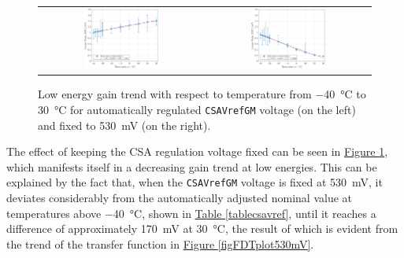 \begin{figure}[h!]
    \centering
    \begin{tabular}{cc}
        \includegraphics[width=0.475\textwidth]{Images/chap1/results/gain_pedestal/low_energy_gain_auto_0011.pdf} & \includegraphics[width=0.475\textwidth]{Images/chap1/results/gain_pedestal/low_energy_gain_530mV.pdf}\\
    \end{tabular}
    \caption{Low energy gain trend with respect to temperature from \SI{-40}{\celsius} to \SI{30}{\celsius} for automatically regulated \texttt{CSAVrefGM} voltage (on the left) and fixed to \SI{530}{\milli\volt} (on the right).}
    \label{figFDTgainLowEnergies}
\end{figure}

The effect of keeping the CSA regulation voltage fixed can be seen in \hyperref[figFDTgainLowEnergies]{Figure \ref{figFDTgainLowEnergies}}, which manifests itself in a decreasing gain trend at low energies. This can be explained by the fact that, when the \texttt{CSAVrefGM} voltage is fixed at \SI{530}{\milli\volt}, it deviates considerably from the automatically adjusted nominal value at temperatures above \SI{-40}{\celsius}, shown in \hyperref[tablecsavref]{Table \ref{tablecsavref}}, until it reaches a difference of approximately \SI{170}{\milli\volt} at \SI{30}{\celsius}, the result of which is evident from the trend of the transfer function in \hyperref[figFDTplot530mV]{Figure \ref{figFDTplot530mV}}.

